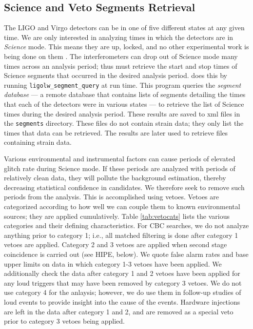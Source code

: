 \subsection{Science and Veto Segments Retrieval}
\label{sec:science_segs_and_vetoes}

The \ac{LIGO} and Virgo detectors can be in one of five different states at any
given time. We are only interested in analyzing times in which the detectors
are in {\it Science} mode. This means they are up, locked, and no other
experimental work is being done on them \cite{?}. The interferometers
can drop out of Science mode many times across an analysis period; thus \ihope
must retrieve the start and stop times of Science segments that occurred in the
desired analysis period. \ihope does this by running
\texttt{ligolw\_segment\_query} at run time. This program queries the {\it
segment database} --- a remote database that contains lists of segments
detailing the times that each of the detectors were in various states --- to
retrieve the list of Science times during the desired analysis period. These
results are saved to xml files in the \texttt{segments} directory. These files
do not contain strain data; they only list the times that data can be
retrieved. The results are later used to retrieve files containing strain data.

Various environmental and instrumental factors can cause periods of elevated
glitch rate during Science mode. If these periods are analyzed with periods of
relatively clean data, they will pollute the background estimation, thereby
decreasing statistical confidence in candidates. We therefore seek to remove
such periods from the analysis. This is accomplished using vetoes. Vetoes are
categorized according to how well we can couple them to known environmental
sources; they are applied cumulatively. Table \ref{tab:vetocats} lists the
various categories and their defining characteristics. For \ac{CBC} searches,
we do not analyze anything prior to category 1; i.e., all matched filtering is
done after category 1 vetoes are applied. Category 2 and 3 vetoes are applied
when second stage coincidence is carried out (see HIPE, below). We quote false
alarm rates and base upper limits on data in which category 1-3 vetoes have
been applied. We additionally check the data after category 1 and 2 vetoes have
been applied for any loud triggers that may have been removed by category 3
vetoes. We do not use category 4 for the anlaysis; however, we do use them in
follow-up studies of loud events to provide insight into the cause of the
events. Hardware injections are left in the data after category 1 and 2, and
are removed as a special veto prior to category 3 vetoes being applied.


